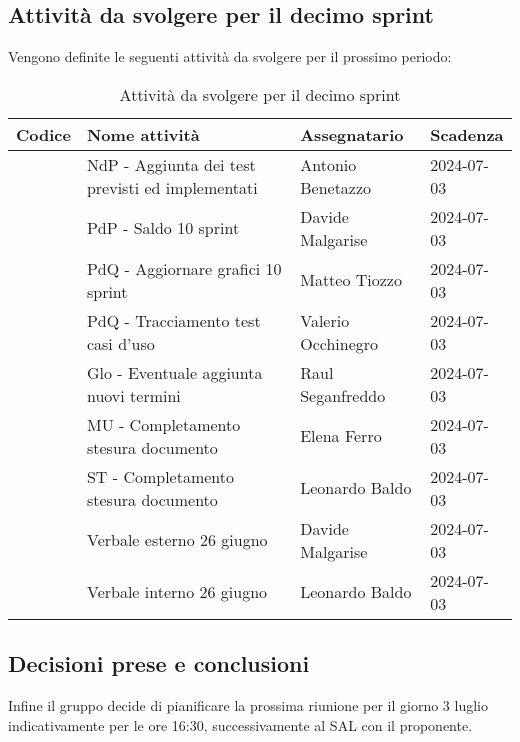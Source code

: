 \documentclass[italian,12pt]{article}
\begin{document}
\newpage

\subsection{Attività da svolgere per il decimo sprint}
Vengono definite le seguenti attività da svolgere per il prossimo periodo:
\begin{table}[!h]
	\centering
	\begin{tabular}{ |l||l|l|l| }
		\hline
		\textbf{Codice}          & \textbf{Nome attività}                           & \textbf{Assegnatario} & \textbf{Scadenza} \\
		\hline
		\mySkip[86bz8e29k]       & NdP - Aggiunta dei test previsti ed implementati & Antonio Benetazzo     & 2024-07-03        \\
		\mySkip[86bz8e6dg]       & PdP - Saldo 10 sprint               				& Davide Malgarise      & 2024-07-03        \\
		\mySkip[86bz8e4c2]       & PdQ - Aggiornare grafici 10 sprint               & Matteo Tiozzo      	& 2024-07-03        \\
		\mySkip[86bz8e54v]       & PdQ - Tracciamento test casi d'uso               & Valerio Occhinegro    & 2024-07-03        \\
		\mySkip[86bz8e8hb]       & Glo - Eventuale aggiunta nuovi termini           & Raul Seganfreddo      & 2024-07-03        \\
		\mySkip[86bz8e2n7]       & MU - Completamento stesura documento     		& Elena Ferro           & 2024-07-03        \\
		\mySkip[86bz8e3y2]       & ST - Completamento stesura documento            	& Leonardo Baldo        & 2024-07-03        \\
		\mySkip[86bz9gkmf]       & Verbale esterno 26 giugno                        & Davide Malgarise      & 2024-07-03        \\
		\mySkip[86bz9gkth]       & Verbale interno 26 giugno                        & Leonardo Baldo        & 2024-07-03        \\
		\hline
	\end{tabular}
	\caption{Attività da svolgere per il decimo sprint}
\end{table}

\subsection{Decisioni prese e conclusioni}
Infine il gruppo decide di pianificare la prossima riunione per il giorno 3 luglio indicativamente per le ore 16:30, successivamente al SAL con il proponente.
\end{document}
